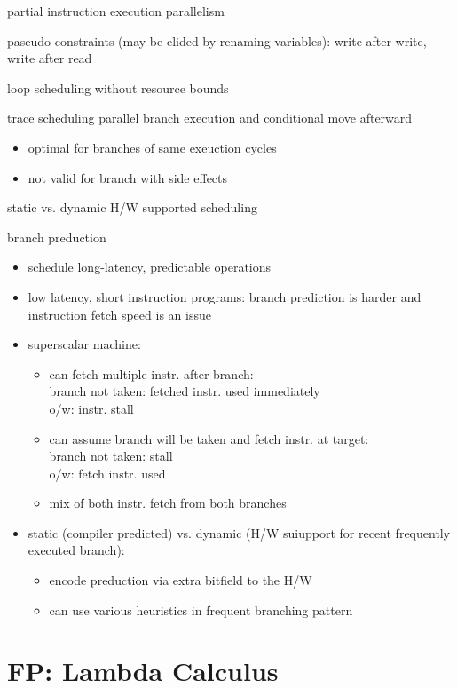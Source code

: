 \documentclass[8pt]{extarticle}
\begin{document}
\begin{multicols*}{2}
  partial instruction execution parallelism

  paseudo-constraints (may be elided by renaming variables): write after write, write after read

  loop scheduling without resource bounds

  trace scheduling
  parallel branch execution and conditional move afterward
  \begin{itemize}
  \item optimal for branches of same exeuction cycles
  \item not valid for branch with side effects
  \end{itemize}

  static vs. dynamic H/W supported scheduling

  branch preduction
  \begin{itemize}
  \item schedule long-latency, predictable operations
  \item low latency, short instruction programs: branch prediction is harder and instruction fetch speed is an issue
  \item superscalar machine:
    \begin{itemize}
    \item can fetch multiple instr. after branch:\\
      branch not taken: fetched instr. used immediately\\
      o/w: instr. stall
    \item can assume branch will be taken and fetch instr. at target:\\
      branch not taken: stall\\
      o/w: fetch instr. used
    \item mix of both instr. fetch from both branches
    \end{itemize}
  \item static (compiler predicted) vs. dynamic (H/W suiupport for recent frequently executed branch):
    \begin{itemize}
    \item encode preduction via extra bitfield to the H/W
    \item can use various heuristics in frequent branching pattern
    \end{itemize}
  \end{itemize}
    
  \vfill\null
  \columnbreak

  \section{FP: Lambda Calculus}


\end{multicols*}
\end{document}
